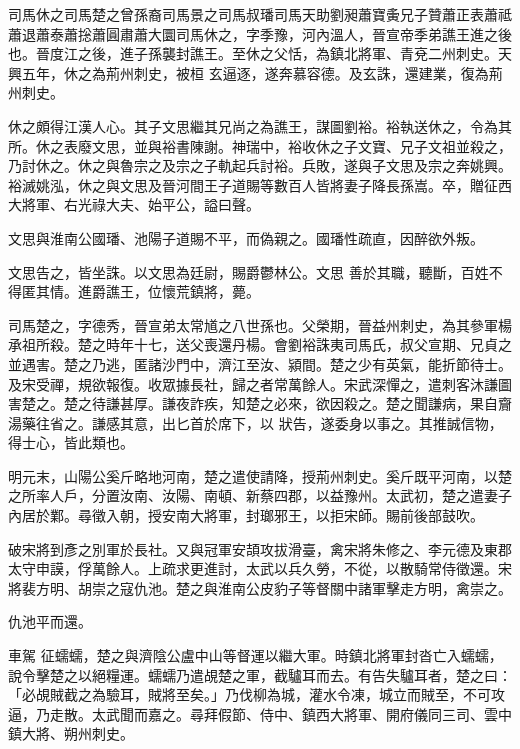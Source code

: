 
\begin{pinyinscope}

 司馬休之司馬楚之曾孫裔司馬景之司馬叔璠司馬天助劉昶蕭寶夤兄子贊蕭正表蕭祗蕭退蕭泰蕭捴蕭圓肅蕭大圜司馬休之，字季豫，河內溫人，晉宣帝季弟譙王進之後也。晉度江之後，進子孫襲封譙王。至休之父恬，為鎮北將軍、青兗二州刺史。天興五年，休之為荊州刺史，被桓
 玄逼逐，遂奔慕容德。及玄誅，還建業，復為荊州刺史。



 休之頗得江漢人心。其子文思繼其兄尚之為譙王，謀圖劉裕。裕執送休之，令為其所。休之表廢文思，並與裕書陳謝。神瑞中，裕收休之子文寶、兄子文祖並殺之，乃討休之。休之與魯宗之及宗之子軌起兵討裕。兵敗，遂與子文思及宗之奔姚興。裕滅姚泓，休之與文思及晉河間王子道賜等數百人皆將妻子降長孫嵩。卒，贈征西大將軍、右光祿大夫、始平公，謚曰聲。



 文思與淮南公國璠、池陽子道賜不平，而偽親之。國璠性疏直，因醉欲外叛。



 文思告之，皆坐誅。以文思為廷尉，賜爵鬱林公。文思
 善於其職，聽斷，百姓不得匿其情。進爵譙王，位懷荒鎮將，薨。



 司馬楚之，字德秀，晉宣弟太常馗之八世孫也。父榮期，晉益州刺史，為其參軍楊承祖所殺。楚之時年十七，送父喪還丹楊。會劉裕誅夷司馬氏，叔父宣期、兄貞之並遇害。楚之乃逃，匿諸沙門中，濟江至汝、潁間。楚之少有英氣，能折節待士。及宋受禪，規欲報復。收眾據長社，歸之者常萬餘人。宋武深憚之，遣刺客沐謙圖害楚之。楚之待謙甚厚。謙夜詐疾，知楚之必來，欲因殺之。楚之聞謙病，果自齎湯藥往省之。謙感其意，出匕首於席下，以
 狀告，遂委身以事之。其推誠信物，得士心，皆此類也。



 明元末，山陽公奚斤略地河南，楚之遣使請降，授荊州刺史。奚斤既平河南，以楚之所率人戶，分置汝南、汝陽、南頓、新蔡四郡，以益豫州。太武初，楚之遣妻子內居於鄴。尋徵入朝，授安南大將軍，封瑯邪王，以拒宋師。賜前後部鼓吹。



 破宋將到彥之別軍於長社。又與冠軍安頡攻拔滑臺，禽宋將朱修之、李元德及東郡太守申謨，俘萬餘人。上疏求更進討，太武以兵久勞，不從，以散騎常侍徵還。宋將裴方明、胡崇之寇仇池。楚之與淮南公皮豹子等督關中諸軍擊走方明，禽崇之。



 仇池平而還。



 車駕
 征蠕蠕，楚之與濟陰公盧中山等督運以繼大軍。時鎮北將軍封沓亡入蠕蠕，說令擊楚之以絕糧運。蠕蠕乃遣覘楚之軍，截驢耳而去。有告失驢耳者，楚之曰：「必覘賊截之為驗耳，賊將至矣。」乃伐柳為城，灌水令凍，城立而賊至，不可攻逼，乃走散。太武聞而嘉之。尋拜假節、侍中、鎮西大將軍、開府儀同三司、雲中鎮大將、朔州刺史。




\end{pinyinscope}
